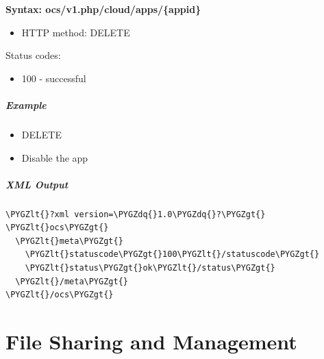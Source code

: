 \documentclass[letterpaper,10pt,english]{sphinxmanual}
\def\PYGZlt{\char`\<}
\def\PYGZgt{\char`\>}
\def\PYGZdq{\char`\"}
\begin{document}
\textbf{Syntax: ocs/v1.php/cloud/apps/\{appid\}}
\begin{itemize}
\item {} 
HTTP method: DELETE

\end{itemize}

Status codes:
\begin{itemize}
\item {} 
100 - successful

\end{itemize}


\paragraph{Example}
\label{configuration_user/user_provisioning_api:id36}\begin{itemize}
\item {} 
DELETE 

\item {} 
Disable the  app

\end{itemize}


\paragraph{XML Output}
\label{configuration_user/user_provisioning_api:id37}
\begin{Verbatim}[commandchars=\\\{\}]
\PYGZlt{}?xml version=\PYGZdq{}1.0\PYGZdq{}?\PYGZgt{}
\PYGZlt{}ocs\PYGZgt{}
  \PYGZlt{}meta\PYGZgt{}
    \PYGZlt{}statuscode\PYGZgt{}100\PYGZlt{}/statuscode\PYGZgt{}
    \PYGZlt{}status\PYGZgt{}ok\PYGZlt{}/status\PYGZgt{}
  \PYGZlt{}/meta\PYGZgt{}
\PYGZlt{}/ocs\PYGZgt{}
\end{Verbatim}


\chapter{File Sharing and Management}
\label{configuration_files/index:file-sharing-and-management}\label{configuration_files/index::doc}
\end{document}
